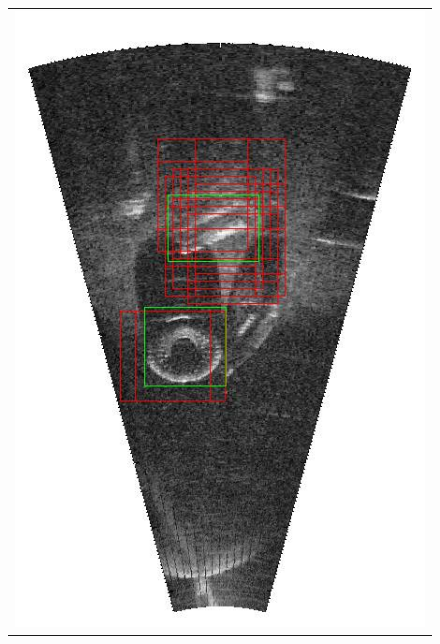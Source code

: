 \begin{figure}[p]
{\begin{tabular}[b]{c}
		\includegraphics[height=0.22\textheight]{chapters/images/proposals/detections/fcn-nms070-2016-02-11_070611-frame04292-topK10-proposals.jpg}

\end{tabular}}
\end{figure}

